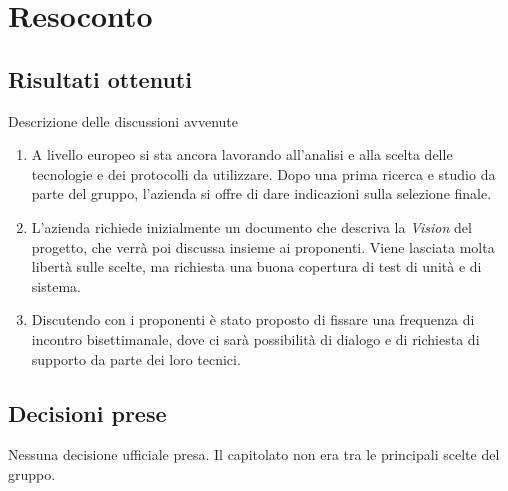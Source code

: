 \section{Resoconto}

\subsection{Risultati ottenuti}
Descrizione delle discussioni avvenute
\begin{enumerate}
    \item A livello europeo si sta ancora lavorando all'analisi e alla scelta delle tecnologie e dei protocolli da utilizzare. Dopo una prima ricerca e studio da parte del gruppo, l'azienda si offre di dare indicazioni sulla selezione finale.
    \item L'azienda richiede inizialmente un documento che descriva la \textit{Vision} del progetto, che verrà poi discussa insieme ai proponenti. Viene lasciata molta libertà sulle scelte, ma richiesta una buona copertura di test di unità e di sistema.
    \item Discutendo con i proponenti è stato proposto di fissare una frequenza di incontro bisettimanale, dove ci sarà possibilità di dialogo e di richiesta di supporto da parte dei loro tecnici.
\end{enumerate}

\subsection{Decisioni prese}
Nessuna decisione ufficiale presa. Il capitolato non era tra le principali scelte del gruppo.
